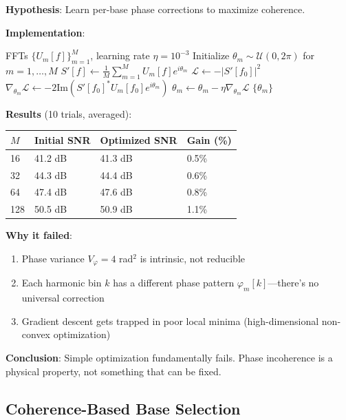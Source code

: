 \documentclass[10pt,twocolumn]{article}
\begin{document}
\textbf{Hypothesis}: Learn per-base phase corrections to maximize coherence.

\textbf{Implementation}:
\begin{algorithm}[H]
\caption{Phase Learning via Gradient Descent}
\begin{algorithmic}[1]
\Require FFTs $\{U_m[f]\}_{m=1}^M$, learning rate $\eta = 10^{-3}$
\State Initialize $\theta_m \sim \mathcal{U}(0, 2\pi)$ for $m = 1, \ldots, M$
    \State $S'[f] \gets \frac{1}{M} \sum_{m=1}^M U_m[f] e^{i\theta_m}$
    \State $\mathcal{L} \gets {-}|S'[f_0]|^2$ 
    \State $\nabla_{\theta_m} \mathcal{L} \gets {-}2 \text{Im}(S'[f_0]^* U_m[f_0] e^{i\theta_m})$
    \State $\theta_m \gets \theta_m - \eta \nabla_{\theta_m} \mathcal{L}$
\EndFor
\State \Return $\{\theta_m\}$
\end{algorithmic}
\end{algorithm}

\textbf{Results} (10 trials, averaged):
\begin{center}
\begin{tabular}{llll}
\toprule
$M$ & Initial SNR & Optimized SNR & Gain (\%) \\
\midrule
16 & 41.2 dB & 41.3 dB & 0.5\% \\
32 & 44.3 dB & 44.4 dB & 0.6\% \\
64 & 47.4 dB & 47.6 dB & 0.8\% \\
128 & 50.5 dB & 50.9 dB & 1.1\% \\
\bottomrule
\end{tabular}
\end{center}

\textbf{Why it failed}:
\begin{enumerate}
\item Phase variance $V_\varphi = 4$ rad$^2$ is intrinsic, not reducible
\item Each harmonic bin $k$ has a different phase pattern $\varphi_m[k]$---there's no universal correction
\item Gradient descent gets trapped in poor local minima (high-dimensional non-convex optimization)
\end{enumerate}

\textbf{Conclusion}: Simple optimization fundamentally fails. Phase incoherence is a physical property, not something that can be fixed.

\subsection{Coherence-Based Base Selection}
\end{document}
